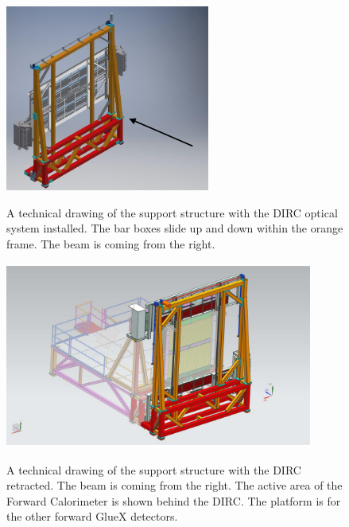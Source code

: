 \documentclass[11pt, a4paper]{article}
\begin{document}
\begin{figure}[h]
\centering
\includegraphics[width=0.6\textwidth]{pics/support.png} 
\caption{\label{pic:support}} A technical drawing of the support structure with the DIRC optical system installed. The bar boxes slide up and down within the orange frame. The beam is coming from the right.
\end{figure}

\begin{figure}[!h]
\centering
\includegraphics[width=0.9\textwidth]{pics/Full_Assy_Iso-retracted.pdf}
\caption{\label{pic:retracted}} A technical drawing of the support structure with the DIRC retracted. The beam is coming from the right. The active area of the Forward Calorimeter is shown behind the DIRC. The platform is for the other forward GlueX detectors.
\end{figure}
\end{document}
